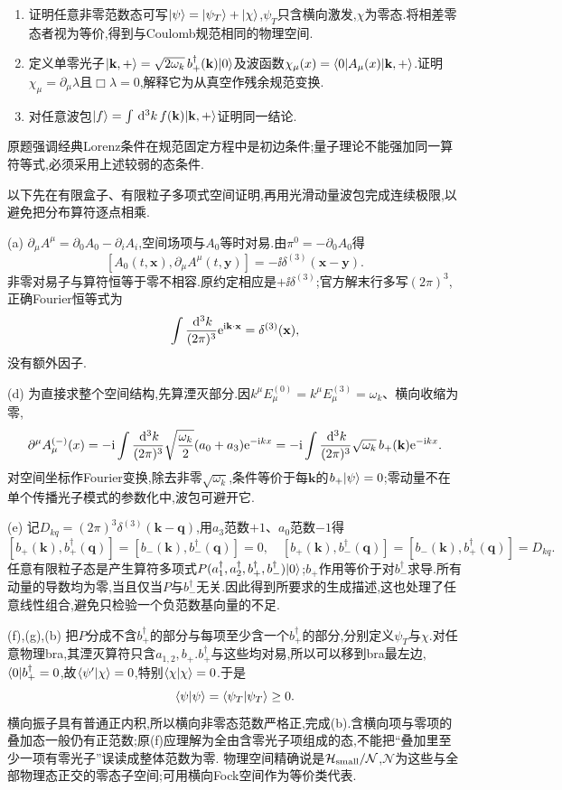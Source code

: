 \begin{exercise}
\begin{enumerate}[label=(\alph*)]
\item 证明任意非零范数态可写$\lvert \psi\rangle=\lvert \psi_T\rangle+\lvert \chi\rangle$,$\psi_T$只含横向激发,$\chi$为零态.将相差零态者视为等价,得到与Coulomb规范相同的物理空间.
\item 定义单零光子$\lvert \mathbf k,+\rangle=\sqrt{2\omega_k}\,b_+^\dagger(\mathbf k)\lvert 0\rangle$及波函数$\chi_\mu(x)=\langle 0\rvert A_\mu(x)\lvert \mathbf k,+\rangle$.证明$\chi_\mu=\partial_\mu\lambda$且$\Box\lambda=0$,解释它为从真空作残余规范变换.
\item 对任意波包$\lvert f\rangle=\int\,\mathrm d^3k\,f(\mathbf k)\lvert \mathbf k,+\rangle$证明同一结论.
\end{enumerate}
原题强调经典Lorenz条件在规范固定方程中是初边条件;量子理论不能强加同一算符等式,必须采用上述较弱的态条件.
\end{exercise}
\begin{solution}
以下先在有限盒子、有限粒子多项式空间证明,再用光滑动量波包完成连续极限,以避免把分布算符逐点相乘.

(a) $\partial_\mu A^\mu=\partial_0A_0-\partial_iA_i$,空间场项与$A_0$等时对易.由$\pi^0=-\partial_0A_0$得
\[
 [A_0(t,\mathbf x),\partial_\mu A^\mu(t,\mathbf y)]
 =-\ii\delta^{(3)}(\mathbf x-\mathbf y).
\]
非零对易子与算符恒等于零不相容.原约定相应是$+\ii\delta^{(3)}$;官方解末行多写$(2\pi)^3$,正确Fourier恒等式为\[\int\frac{\,\mathrm d^3k}{(2\pi)^3}\mathrm e^{\mathrm i\mathbf k\cdot\mathbf x}=\delta^{(3)}(\mathbf x),\]没有额外因子.

(d) 为直接求整个空间结构,先算湮灭部分.因$k^\mu E_\mu^{(0)}=k^\mu E_\mu^{(3)}=\omega_k$、横向收缩为零,
\[
 \partial^\mu A_\mu^{(-)}(x)=-\mathrm i\int\frac{\,\mathrm d^3k}{(2\pi)^3}
 \sqrt{\frac{\omega_k}{2}}(a_0+a_3)\mathrm e^{-\mathrm i kx}
 =-\mathrm i\int\frac{\,\mathrm d^3k}{(2\pi)^3}\sqrt{\omega_k}\,b_+(\mathbf k)\mathrm e^{-\mathrm i kx}.
\]
对空间坐标作Fourier变换,除去非零$\sqrt{\omega_k}$,条件等价于每$\mathbf k$的$b_+\lvert \psi\rangle=0$;零动量不在单个传播光子模式的参数化中,波包可避开它.

(e) 记$D_{kq}=(2\pi)^3\delta^{(3)}(\mathbf k-\mathbf q)$,用$a_3$范数$+1$、$a_0$范数$-1$得
\[
 [b_+(\mathbf k),b_+^\dagger(\mathbf q)]=[b_-(\mathbf k),b_-^\dagger(\mathbf q)]=0,
 \quad[b_+(\mathbf k),b_-^\dagger(\mathbf q)]=[b_-(\mathbf k),b_+^\dagger(\mathbf q)]=D_{kq}.
\]
任意有限粒子态是产生算符多项式$P(a_1^\dagger,a_2^\dagger,b_+^\dagger,b_-^\dagger)\lvert 0\rangle$;$b_+$作用等价于对$b_-^\dagger$求导.所有动量的导数均为零,当且仅当$P$与$b_-^\dagger$无关.因此得到所要求的生成描述,这也处理了任意线性组合,避免只检验一个负范数基向量的不足.

(f),(g),(b) 把$P$分成不含$b_+^\dagger$的部分与每项至少含一个$b_+^\dagger$的部分,分别定义$\psi_T$与$\chi$.对任意物理bra,其湮灭算符只含$a_{1,2},b_+$.$b_+^\dagger$与这些均对易,所以可以移到bra最左边,$\langle 0\rvert b_+^\dagger=0$,故$\langle \psi'\vert \chi\rangle=0$,特别$\langle \chi\vert \chi\rangle=0$.于是
\[
 \langle \psi\vert \psi\rangle=\langle \psi_T\vert \psi_T\rangle\geq0.
\]
横向振子具有普通正内积,所以横向非零态范数严格正,完成(b).含横向项与零项的叠加态一般仍有正范数;原(f)应理解为全由含零光子项组成的态,不能把“叠加里至少一项有零光子”误读成整体范数为零.
物理空间精确说是$\mathcal H_{\rm small}/\mathcal N$,$\mathcal N$为这些与全部物理态正交的零态子空间;可用横向Fock空间作为等价类代表.


\end{solution}
